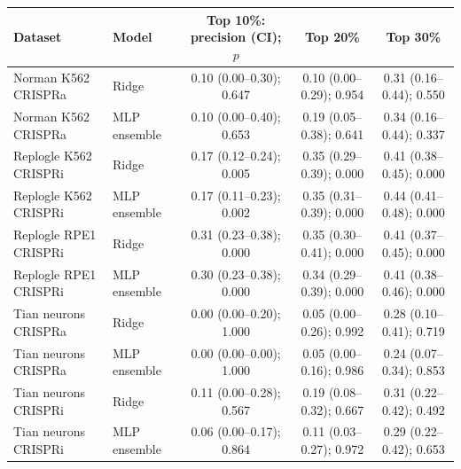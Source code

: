 \begin{tabular}{llccc}
\toprule
Dataset & Model & Top 10\%: precision (CI); $p$ & Top 20\% & Top 30\% \\
\midrule
Norman K562 CRISPRa & Ridge & 0.10 (0.00--0.30); 0.647 & 0.10 (0.00--0.29); 0.954 & 0.31 (0.16--0.44); 0.550 \\
Norman K562 CRISPRa & MLP ensemble & 0.10 (0.00--0.40); 0.653 & 0.19 (0.05--0.38); 0.641 & 0.34 (0.16--0.44); 0.337 \\
Replogle K562 CRISPRi & Ridge & 0.17 (0.12--0.24); 0.005 & 0.35 (0.29--0.39); 0.000 & 0.41 (0.38--0.45); 0.000 \\
Replogle K562 CRISPRi & MLP ensemble & 0.17 (0.11--0.23); 0.002 & 0.35 (0.31--0.39); 0.000 & 0.44 (0.41--0.48); 0.000 \\
Replogle RPE1 CRISPRi & Ridge & 0.31 (0.23--0.38); 0.000 & 0.35 (0.30--0.41); 0.000 & 0.41 (0.37--0.45); 0.000 \\
Replogle RPE1 CRISPRi & MLP ensemble & 0.30 (0.23--0.38); 0.000 & 0.34 (0.29--0.39); 0.000 & 0.41 (0.38--0.46); 0.000 \\
Tian neurons CRISPRa & Ridge & 0.00 (0.00--0.20); 1.000 & 0.05 (0.00--0.26); 0.992 & 0.28 (0.10--0.41); 0.719 \\
Tian neurons CRISPRa & MLP ensemble & 0.00 (0.00--0.00); 1.000 & 0.05 (0.00--0.16); 0.986 & 0.24 (0.07--0.34); 0.853 \\
Tian neurons CRISPRi & Ridge & 0.11 (0.00--0.28); 0.567 & 0.19 (0.08--0.32); 0.667 & 0.31 (0.22--0.42); 0.492 \\
Tian neurons CRISPRi & MLP ensemble & 0.06 (0.00--0.17); 0.864 & 0.11 (0.03--0.27); 0.972 & 0.29 (0.22--0.42); 0.653 \\
\bottomrule
\end{tabular}